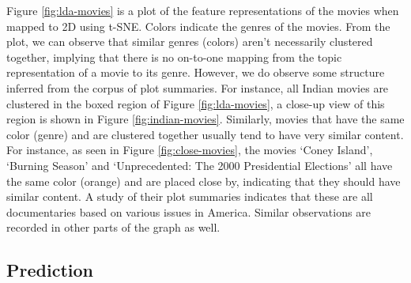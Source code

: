 \documentclass{article} %
\begin{document}

Figure \ref{fig:lda-movies} is a plot of the feature representations of the
movies when mapped to 2D using t-SNE. Colors indicate the genres of the movies.
From the plot, we can observe that similar genres (colors) aren't necessarily
clustered together, implying that there is no on-to-one mapping from the topic
representation of a movie to its genre. However, we do observe some structure 
inferred from the corpus of plot summaries. For instance, all Indian movies
are clustered in the boxed region of Figure \ref{fig:lda-movies}, a close-up
view of this region is shown in Figure \ref{fig:indian-movies}. Similarly, 
movies that have the same color (genre) and are clustered together usually
tend to have very similar content. For instance, as seen in Figure \ref{fig:close-movies}, the movies `Coney Island', `Burning Season' and `Unprecedented: The 2000 Presidential Elections' all have the same color (orange) and are placed
close by, indicating that they should have similar content. A study of their 
plot summaries indicates that these are all documentaries based on various 
issues in America. Similar observations are recorded in other parts of the graph
as well. 

\subsection{Prediction}
\end{document}
